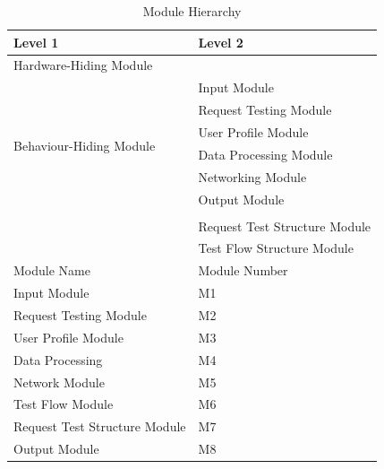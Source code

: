 \documentclass[12pt, titlepage]{article}
\begin{document}
\begin{table}[h!]
\centering
\begin{tabular}{p{} p{}}
\toprule
\textbf{Level 1} & \textbf{Level 2}\\
\midrule

{Hardware-Hiding Module} & ~ \\
\midrule

\multirow{7}{0.3\textwidth}{Behaviour-Hiding Module}
& Input Module\\
& Request Testing Module\\
& User Profile Module\\
& Data Processing Module\\
& Networking Module\\
& Output Module\\
\midrule

\multirow{3}{0.3\textwidth}{Software Decision Module}\\
& Request Test Structure Module\\
& Test Flow Structure Module\\
\midrule
{Module Name} & {Module Number}\\
\midrule
Input Module & M1\\
Request Testing Module & M2\\
User Profile Module & M3\\
Data Processing & M4\\
Network Module & M5\\
Test Flow Module & M6\\
Request Test Structure Module & M7\\
Output Module & M8\\
\bottomrule

\end{tabular}
\caption{Module Hierarchy}
\label{TblMH}
\end{table}
\newpage

\end{document}
